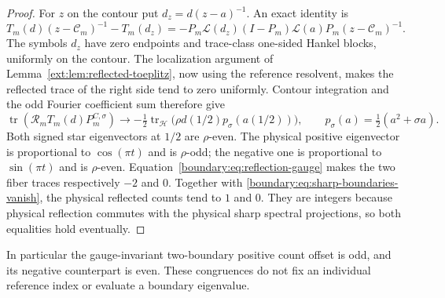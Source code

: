 \begin{proof}
For $z$ on the contour put $d_z=d(z-a)^{-1}$. An exact identity is
\[
 T_m(d)(z-\mathscr C_m)^{-1}-T_m(d_z)
 =-P_m\mathcal L(d_z)(I-P_m)\mathcal L(a)P_m
                         (z-\mathscr C_m)^{-1}.
\]
The symbols $d_z$ have zero endpoints and trace-class one-sided Hankel
blocks, uniformly on the contour. The localization argument of
Lemma~\ref{ext:lem:reflected-toeplitz}, now using the reference resolvent,
makes the reflected trace of the right side tend to zero uniformly.
Contour integration and the odd Fourier coefficient sum therefore give
\[
 \operatorname{tr}(\mathcal R_mT_m(d)P_m^{C,\sigma})
 \longrightarrow-\tfrac12\operatorname{tr}_{\mathscr H}
 \bigl(\rho d(1/2)p_\sigma(a(1/2))\bigr),
 \qquad p_\sigma(a)=\tfrac12(a^2+\sigma a).
\]
Both signed star eigenvectors at $1/2$ are $\rho$-even. The physical
positive eigenvector is proportional to $\cos(\pi t)$ and is
$\rho$-odd; the negative one is proportional to $\sin(\pi t)$ and
is $\rho$-even. Equation~\eqref{boundary:eq:reflection-gauge} makes the
two fiber traces respectively $-2$ and $0$. Together with
\eqref{boundary:eq:sharp-boundaries-vanish}, the physical reflected
counts tend to $1$ and $0$. They are integers because physical
reflection commutes with the physical sharp spectral projections,
so both equalities hold eventually.
\end{proof}

In particular the gauge-invariant two-boundary positive count offset
is odd, and its negative counterpart is even. These congruences do not
fix an individual reference index or evaluate a boundary eigenvalue.


